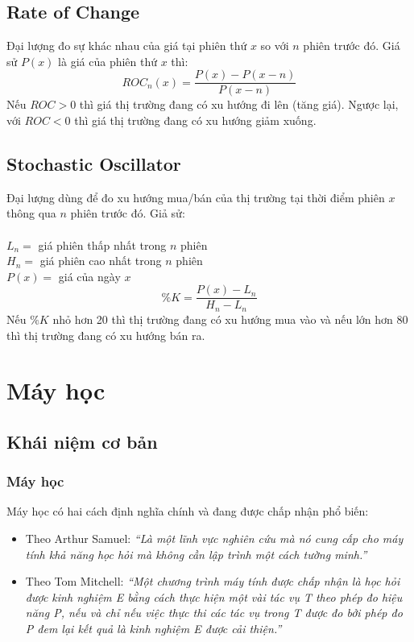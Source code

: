 \subsection{Rate of Change}
Đại lượng đo sự khác nhau của giá tại phiên thứ $x$ so với $n$ phiên trước đó. 
Giá sử $P(x)$ là giá của phiên thứ $x$ thì:
\[ ROC_{n}(x)=\frac{P(x)-P(x-n)}{P(x-n)}\]
Nếu $ROC > 0$ thì giá thị trường đang có xu hướng đi lên (tăng giá).
Ngược lại, với $ROC < 0$ thì giá thị trường đang có xu hướng giảm xuống.
\subsection{Stochastic Oscillator}
Đại lượng dùng để đo xu hướng mua/bán của thị trường tại thời điểm phiên $x$ 
thông qua $n$ phiên trước đó. Giả sử:\\\\
\tab $L_{n} = $ giá phiên thấp nhất trong $n$ phiên\\
\tab $H_{n} = $ giá phiên cao nhất trong $n$ phiên\\
\tab $P(x) = $ giá của ngày $x$\\
\[\%K=\frac{P(x)-L_{n}}{H_{n}-L_{n}}\]
Nếu $ \%K $ nhỏ hơn 20 thì thị trường đang có xu hướng mua vào và nếu lớn hơn 
80 thì thị trường đang có xu hướng bán ra.


\section{Máy học}
\subsection{Khái niệm cơ bản}
\subsubsection{Máy học}
Máy học có hai cách định nghĩa chính và đang được chấp nhận phổ biến:
\begin{itemize}
  \item Theo Arthur Samuel: \textit{``Là một lĩnh vực nghiên cứu mà nó cung cấp cho
  máy tính khả năng học hỏi mà không cần lập trình một cách tường minh.''}
  \item Theo Tom Mitchell: \textit{``Một chương trình máy tính được chấp nhận
  là học hỏi được kinh nghiệm E bằng cách thực hiện một vài tác vụ T theo phép đo hiệu
  năng P, nếu và chỉ nếu việc thực thi các tác vụ trong T được đo bởi phép đo P
  đem lại kết quả là kinh nghiệm E được cải thiện.''}
\end{itemize}
